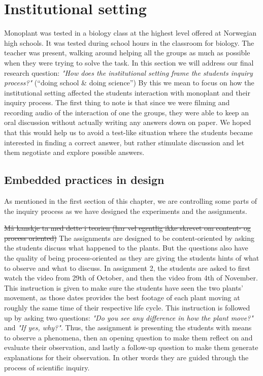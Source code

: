 \section{Institutional setting}
Monoplant was tested in a biology class at the highest level offered at Norwegian high schools. It was tested during school hours in the classroom for biology. The teacher was present, walking around helping all the groups as much as possible when they were trying to solve the task. In this section we will address our final research question: \emph{"How does the institutional setting frame the students inquiry process?"} (“doing school \& doing science”)
By this we mean to focus on how the institutional setting affected the students interaction with monoplant and their inquiry process. The first thing to note is that since we were filming and recording audio of the interaction of one the groups, they were able to keep an oral discussion without actually writing any answers down on paper. We hoped that this would help us to avoid a test-like situation where the students became interested in finding a correct answer, but rather stimulate discussion and let them negotiate and explore possible answers.

\subsection{Embedded practices in design}
As mentioned in the first section of this chapter, we are controlling some parts of the inquiry process as we have designed the experiments and the assignments. 

\sout{Må kanskje ta med dette i teorien (har vel egentlig ikke skrevet om content- og process oriented)}
The assignments are designed to be content-oriented by asking the students discuss what happened to the plants. But the questions also have the quality of being process-oriented as they are giving the students hints of what to observe and what to discuss. In assignment 2, the students are asked to first watch the video from 29th of October, and then the video from 4th of November. This instruction is given to make sure the students have seen the two plants' movement, as those dates provides the best footage of each plant moving at roughly the same time of their respective life cycle. This instruction is followed up by asking two questions: \emph{"Do you see any difference in how the plant move?"} and \emph{"If yes, why?"}. Thus, the assignment is presenting the students with means to observe a phenomena, then an opening question to make them reflect on and evaluate their observation, and lastly a follow-up question to make them generate explanations for their observation. In other words they are guided through the process of scientific inquiry.

